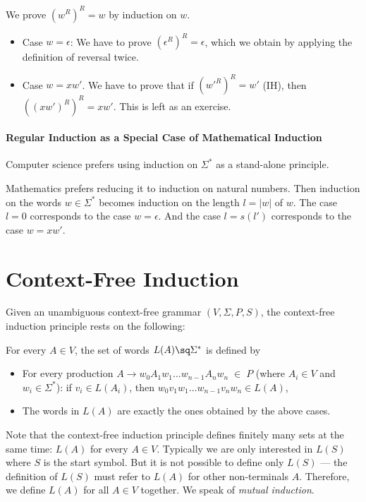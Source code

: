 \begin{example}\label{ex:induction:thm:reverse}
We prove $(w^R)^R=w$ by induction on $w$.
\begin{itemize}
 \item Case $w=\epsilon$: We have to prove $(\epsilon^R)^R=\epsilon$, which we obtain by applying the definition of reversal twice.
 \item Case $w=xw'$. We have to prove that if $(w'^R)^R=w'$ (IH), then $((xw')^R)^R=xw'$.
   This is left as an exercise.
\end{itemize}
\end{example}

\paragraph{Regular Induction as a Special Case of Mathematical Induction}
Computer science prefers using induction on $\Sigma^*$ as a stand-alone principle.

Mathematics prefers reducing it to induction on natural numbers.
Then induction on the words $w\in\Sigma^*$ becomes induction on the length $l=|w|$ of $w$.
The case $l=0$ corresponds to the case $w=\epsilon$.
And the case $l=s(l')$ corresponds to the case $w=xw'$.

\section{Context-Free Induction}\label{sec:induction:cf}

Given an unambiguous context-free grammar $(V,\Sigma,P,S)$, the context-free induction principle rests on the following:

\begin{definition}\label{def:ind:cf}
For every $A\in V$, the set of words $L(A)\sq\Sigma^*$ is defined by
 \begin{itemize}
   \item For every production $A\to w_0A_1w_1\ldots w_{n-1}A_n w_n \;\in\;P$ (where $A_i\in V$ and $w_i\in\Sigma^*$): if $v_i\in L(A_i)$, then $w_0 v_1 w_1\ldots w_{n-1}v_n w_n\in L(A)$,
   \item The words in $L(A)$ are exactly the ones obtained by the above cases.
 \end{itemize}
\end{definition}

\begin{remark}
Note that the context-free induction principle defines finitely many sets at the same time: $L(A)$ for every $A\in V$.
Typically we are only interested in $L(S)$ where $S$ is the start symbol.
But it is not possible to define only $L(S)$ --- the definition of $L(S)$ must refer to $L(A)$ for other non-terminals $A$.
Therefore, we define $L(A)$ for all $A\in V$ together.
We speak of \emph{mutual induction}.
\end{remark}

